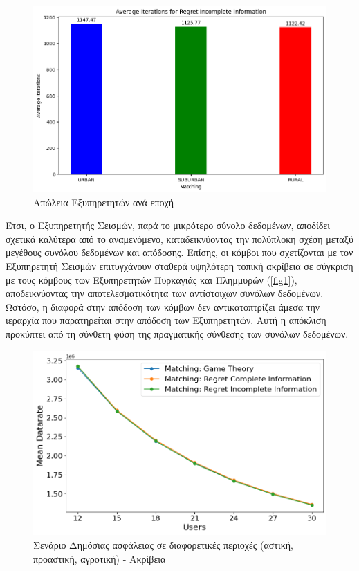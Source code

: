 \begin{figure}[ht]
    \centering
    \includegraphics[width=\textwidth]{figures/chapter4/Average_Iterations_per_area_RII.png}
    \caption{Απώλεια Εξυπηρετητών ανά εποχή}
    \label{fig4}
\end{figure}

Έτσι, ο Εξυπηρετητής Σεισμών, παρά το μικρότερο σύνολο δεδομένων, αποδίδει σχετικά καλύτερα από το αναμενόμενο, καταδεικνύοντας την πολύπλοκη σχέση μεταξύ μεγέθους συνόλου δεδομένων και απόδοσης. Επίσης, οι κόμβοι που σχετίζονται με τον Εξυπηρετητή Σεισμών επιτυγχάνουν σταθερά υψηλότερη τοπική ακρίβεια σε σύγκριση με τους κόμβους των Εξυπηρετητών Πυρκαγιάς και Πλημμυρών (\ref{fig1}), αποδεικνύοντας την αποτελεσματικότητα των αντίστοιχων συνόλων δεδομένων. Ωστόσο, η διαφορά στην απόδοση των κόμβων δεν αντικατοπτρίζει άμεσα την ιεραρχία που παρατηρείται στην απόδοση των Εξυπηρετητών. Αυτή η απόκλιση προκύπτει από τη σύνθετη φύση της πραγματικής σύνθεσης των συνόλων δεδομένων.

\newpage

\begin{figure}[H]
    \centering
    \includegraphics[width=\textwidth]{figures/chapter4/Mean_Datarate_vs_Users.png}
    \caption{Σενάριο Δημόσιας ασφάλειας σε διαφορετικές περιοχές (αστική, προαστική, αγροτική) - Ακρίβεια}
    \label{fig5}
\end{figure}

